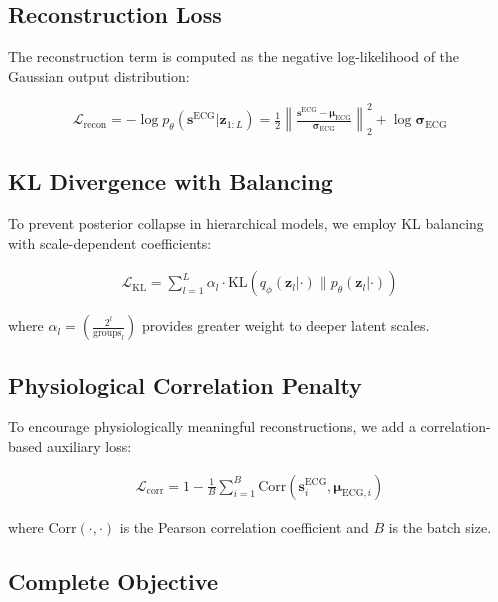 \documentclass[11pt]{article}
\begin{document}
\subsection{Reconstruction Loss}

The reconstruction term is computed as the negative log-likelihood of the Gaussian output distribution:

\begin{align}
\mathcal{L}_{\text{recon}} = -\log p_\theta(\mathbf{s}^{\text{ECG}} | \mathbf{z}_{1:L}) = \frac{1}{2} \left\| \frac{\mathbf{s}^{\text{ECG}} - \boldsymbol{\mu}_{\text{ECG}}}{\boldsymbol{\sigma}_{\text{ECG}}} \right\|_2^2 + \log \boldsymbol{\sigma}_{\text{ECG}}
\end{align}

\subsection{KL Divergence with Balancing}

To prevent posterior collapse in hierarchical models, we employ KL balancing with scale-dependent coefficients:

\begin{align}
\mathcal{L}_{\text{KL}} = \sum_{l=1}^{L} \alpha_l \cdot \text{KL}\left( q_\phi(\mathbf{z}_l | \cdot) \| p_\theta(\mathbf{z}_l | \cdot) \right)
\end{align}

where $\alpha_l = \left(\frac{2^l}{\text{groups}_l}\right)$ provides greater weight to deeper latent scales.

\subsection{Physiological Correlation Penalty}

To encourage physiologically meaningful reconstructions, we add a correlation-based auxiliary loss:

\begin{align}
\mathcal{L}_{\text{corr}} = 1 - \frac{1}{B} \sum_{i=1}^{B} \text{Corr}(\mathbf{s}_i^{\text{ECG}}, \boldsymbol{\mu}_{\text{ECG},i})
\end{align}

where $\text{Corr}(\cdot, \cdot)$ is the Pearson correlation coefficient and $B$ is the batch size.

\subsection{Complete Objective}
\end{document}
